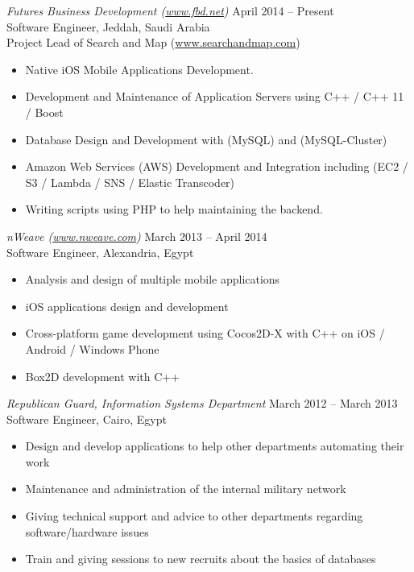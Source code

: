 \documentclass[10pt]{res} %
\begin{document}
\begin{resume}
{\sl Futures Business Development (\href{www.fbd.net}{www.fbd.net})} \hfill April 2014 -- Present \\
Software Engineer, Jeddah, Saudi Arabia \\
Project Lead of Search and Map (\href{https://www.searchandmap.com}{www.searchandmap.com}) \\
\begin{itemize} \itemsep -2pt %
\item Native iOS Mobile Applications Development.
\item Development and Maintenance of Application Servers using C++ / C++ 11 / Boost
\item Database Design and Development with (MySQL) and (MySQL-Cluster) 
\item Amazon Web Services (AWS) Development and Integration including (EC2 / S3 / Lambda / SNS / Elastic Transcoder)
\item Writing scripts using PHP to help maintaining the backend.
\end{itemize}

{\sl nWeave (\href{www.nweave.com}{www.nweave.com})} \hfill March 2013 -- April 2014 \\
Software Engineer, Alexandria, Egypt \\
\begin{itemize} \itemsep -2pt %
\item Analysis and design of multiple mobile applications
\item iOS applications design and development
\item Cross-platform game development using Cocos2D-X with C++ on iOS / Android / Windows Phone
\item Box2D development with C++
\end{itemize}

{\sl Republican Guard, Information Systems Department} \hfill March 2012 -- March 2013 \\
Software Engineer, Cairo, Egypt \\
\begin{itemize} \itemsep -2pt %
\item Design and develop applications to help other departments automating their work
\item Maintenance and administration of the internal military network
\item Giving technical support and advice to other departments regarding software/hardware issues
\item Train and giving sessions to new recruits about the basics of databases   
\end{itemize}


\end{resume}
\end{document}
